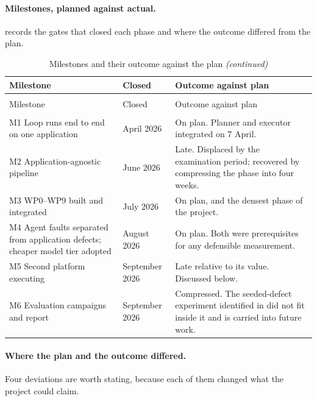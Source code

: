 \paragraph{Milestones, planned against actual.}  records
the gates that closed each phase and where the outcome differed from the plan.

\begingroup
\small
\begin{xltabular}{\textwidth}{@{}>{\hsize}Y>{\hsize}Y>{\hsize}Y@{}}
  \caption{Milestones and their outcome against the plan}
  \label{tab:milestones}\\
  \toprule
  Milestone & Closed & Outcome against plan \\
  \midrule
  \endfirsthead
  \caption[]{Milestones and their outcome against the plan \emph{(continued)}}\\
  \toprule
  Milestone & Closed & Outcome against plan \\
  \midrule
  \endhead
  \midrule
  \\
  \endfoot
  \bottomrule
  \endlastfoot

  M1 Loop runs end to end on one application & April 2026 & On plan. Planner and executor integrated on 7 April. \\
  \addlinespace
  M2 Application-agnostic pipeline & June 2026 & Late. Displaced by the examination period; recovered by compressing the phase into four weeks. \\
  \addlinespace
  M3 WP0--WP9 built and integrated & July 2026 & On plan, and the densest phase of the project. \\
  \addlinespace
  M4 Agent faults separated from application defects; cheaper model tier adopted & August 2026 & On plan. Both were prerequisites for any defensible measurement. \\
  \addlinespace
  M5 Second platform executing & September 2026 & Late relative to its value. Discussed below. \\
  \addlinespace
  M6 Evaluation campaigns and report & September 2026 & Compressed. The seeded-defect experiment identified in  did not fit inside it and is carried into future work. \\
  \bottomrule
\end{xltabular}
\endgroup

\paragraph{Where the plan and the outcome differed.} Four deviations are worth
stating, because each of them changed what the project could claim.


